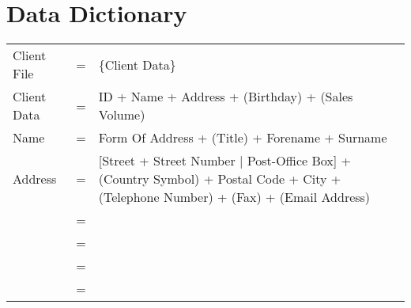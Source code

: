\documentclass[12pt,a4paper]{article}
\begin{document}

\section{Data Dictionary}

\begin{comment}

Required Data (top level)
------------------------
Client File
Order
Article

\end{comment}

\begin{tabular}{p{4cm}p{0.5cm}p{8cm}}
Client File & = & \{Client Data\} \\
Client Data & = & ID + Name + Address + (Birthday) + (Sales Volume) \\
Name & = & Form Of Address + (Title) + Forename + Surname \\
Address & = & [Street + Street Number $|$ Post-Office Box] + (Country Symbol) +  Postal Code + City + (Telephone Number) + (Fax) + (Email Address)\\
& = &  \\
& = &  \\
& = &  \\
& = &  \\
\end{tabular}
\end{document}
